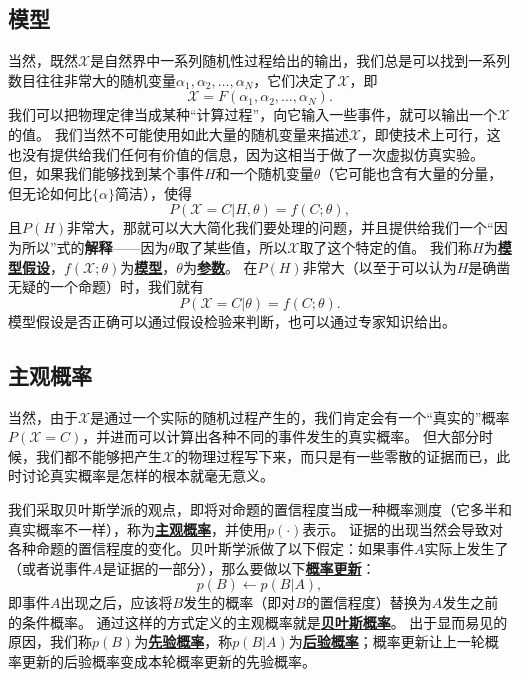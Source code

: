 \documentclass[hyperref, UTF8, a4paper]{ctexart}
\renewcommand{\emph}[1]{\textbf{#1}}
\newcommand*{\concept}[1]{\underline{\textbf{#1}}}
\begin{document}
\subsection{模型}

当然，既然$\mathcal{X}$是自然界中一系列随机性过程给出的输出，我们总是可以找到一系列数目往往非常大的随机变量$\alpha_1, \alpha_2, \ldots, \alpha_N$，它们决定了$\mathcal{X}$，即
\[
    \mathcal{X} = F(\alpha_1, \alpha_2, \ldots, \alpha_N).
\]
我们可以把物理定律当成某种“计算过程”，向它输入一些事件，就可以输出一个$\mathcal{X}$的值。
我们当然不可能使用如此大量的随机变量来描述$\mathcal{X}$，即使技术上可行，这也没有提供给我们任何有价值的信息，因为这相当于做了一次虚拟仿真实验。
但，如果我们能够找到某个事件$H$和一个随机变量$\theta$（它可能也含有大量的分量，但无论如何比$\{\alpha\}$简洁），使得
\[
    P(\mathcal{X} = C | H, \theta) = f(C ; \theta), 
\]
且$P(H)$非常大，那就可以大大简化我们要处理的问题，并且提供给我们一个“因为所以”式的\emph{解释}——因为$\theta$取了某些值，所以$\mathcal{X}$取了这个特定的值。
我们称$H$为\concept{模型假设}，$f(\mathcal{X};\theta)$为\concept{模型}，$\theta$为\concept{参数}。
在$P(H)$非常大（以至于可以认为$H$是确凿无疑的一个命题）时，我们就有
\begin{equation}
    P(\mathcal{X} = C | \theta) = f(C ; \theta).
\end{equation}
模型假设是否正确可以通过假设检验来判断，也可以通过专家知识给出。

\subsection{主观概率}

当然，由于$\mathcal{X}$是通过一个实际的随机过程产生的，我们肯定会有一个“真实的”概率$P(\mathcal{X}=C)$，并进而可以计算出各种不同的事件发生的真实概率。
但大部分时候，我们都不能够把产生$\mathcal{X}$的物理过程写下来，而只是有一些零散的证据而已，此时讨论真实概率是怎样的根本就毫无意义。

我们采取贝叶斯学派的观点，即将对命题的置信程度当成一种概率测度（它多半和真实概率不一样），称为\concept{主观概率}，并使用$p(\cdot)$表示。
证据的出现当然会导致对各种命题的置信程度的变化。贝叶斯学派做了以下假定：如果事件$A$实际上发生了（或者说事件$A$是证据的一部分），那么要做以下\concept{概率更新}：
\begin{equation}
    p(B) \longleftarrow p(B|A),
\end{equation}
即事件$A$出现之后，应该将$B$发生的概率（即对$B$的置信程度）替换为$A$发生之前的条件概率。
通过这样的方式定义的主观概率就是\concept{贝叶斯概率}。
出于显而易见的原因，我们称$p(B)$为\concept{先验概率}，称$p(B|A)$为\concept{后验概率}；概率更新让上一轮概率更新的后验概率变成本轮概率更新的先验概率。
\end{document}
